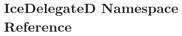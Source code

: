 \hypertarget{namespace_ice_delegate_d}{
\section{IceDelegateD Namespace Reference}
\label{namespace_ice_delegate_d}
}
